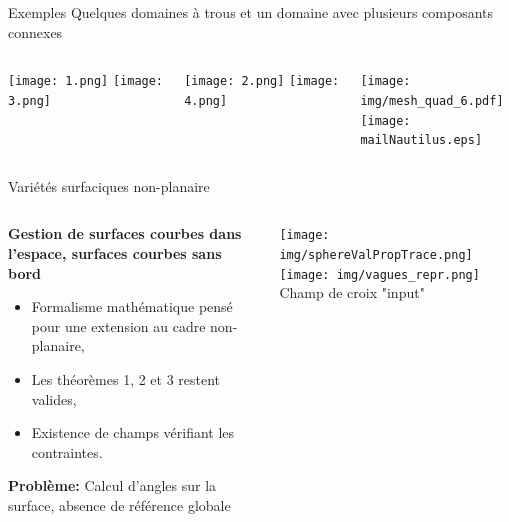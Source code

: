 \begin{frame}{Exemples}{ Quelques domaines à trous et un domaine avec plusieurs composants connexes}
\vspace{-0.25cm}
\begin{columns}
\begin{column}{0.32\textwidth}
    \centering
    \texttt{[image: 1.png]}\vspace{0.6cm}
    \texttt{[image: 3.png]}
\end{column}
\begin{column}{0.32\textwidth}
    \centering
    \texttt{[image: 2.png]}\vspace{0.6cm}
    \texttt{[image: 4.png]}
\end{column}
\begin{column}{0.32\textwidth}
    \centering
    \texttt{[image: img/mesh\_quad\_6.pdf]}\\\vspace{-0.2cm}
    \scriptsize\color{onera_gray}{ Multi-materiau }
    \texttt{[image: mailNautilus.eps]}\\\vspace{-0.1cm}
    \scriptsize\color{onera_gray}{ Nautilus}
\end{column}
\end{columns}
\end{frame}

\begin{frame}{Variétés surfaciques non-planaire}{}
\begin{columns}
\begin{column}{0.45\textwidth}
{\bf\color{onera_gray}Gestion de surfaces courbes dans l'espace, surfaces courbes sans bord}\\\vspace{0.2cm}
\begin{itemize}
    \item Formalisme mathématique pensé pour une extension au cadre non-planaire,\\
    \item Les théorèmes 1, 2 et 3 restent valides,\\
    \item Existence de champs vérifiant les contraintes.\\\vspace{0.2cm}
\end{itemize}
\textbf{Problème: }{\color{red}Calcul d'angles sur la surface, absence de référence globale}\\
\end{column}
\begin{column}{0.55\textwidth}
\centering
\texttt{[image: img/sphereValPropTrace.png]}
\texttt{[image: img/vagues\_repr.png]}\\
\caption{\footnotesize Champ de croix "input"}
\end{column}
\end{columns}
\end{frame}


